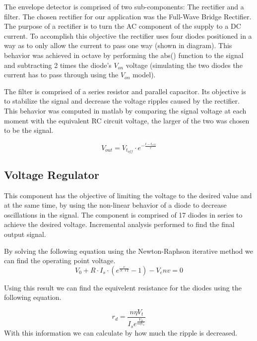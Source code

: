 The envelope detector is comprised of two sub-components: The rectifier and a filter.
The chosen rectifier for our application was the Full-Wave Bridge Rectifier. The purpose of a rectifier is to turn the AC component of the supply to a DC current. To accomplish this objective the rectifier uses four diodes positioned in a way as to only allow the current to pass one way (shown in diagram).
This behavior was achieved in octave by performing the abs() function to the signal and subtracting 2 times the diode’s $V_{on}$ voltage (simulating the two diodes the current has to pass through using the $V_{on}$ model).

The filter is comprised of a series resistor and parallel capacitor. Its objective is to stabilize the signal and decrease the voltage ripples caused by the rectifier. This behavior was computed in matlab by comparing the signal voltage at each moment with the equivalent RC circuit voltage, the larger of the two was chosen to be the signal.

\[
V_{out}=V_{t_{off}}\cdot{}e^{-\frac{t-t_{off}}{\tau}}
\]


\subsection{Voltage Regulator}
\label{subsec:voltreg}

This component has the objective of limiting the voltage to the desired value and at the same time, by using the non-linear behavior of a diode to decrease oscillations in the signal.
The component is comprised of 17 diodes in series to achieve the desired voltage.
Incremental analysis performed to find the final output signal.

By solving the following equation using the Newton-Raphson iterative method we can find the operating point voltage.
\[
V_0 + R\cdot I_s \cdot (e^{\frac{v}{N\cdot VT}}-1)-V_env = 0
\]

Using this result we can find the equivelent resistance for the diodes using the following equation.

\[
r_d=\frac{n\eta V_t}{I_se^{\frac{V_D}{n\eta V_x}}}
\]
With this information we can calculate by how much the ripple is decreased.

